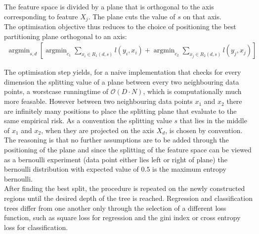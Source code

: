 \documentclass[a4paper, 11pt]{article}
\DeclareMathOperator*{\argmin}{argmin} %
\begin{document}
The feature space is divided by a plane that is orthogonal to the axis corresponding to feature $X_j$. The plane cuts the value of $s$ on that axis.\\
The optimisation objective thus reduces to the choice of positioning  the best partitioning plane orthogonal to an axis:
\begin{align*}
\argmin_{s, d}[\argmin_{c_1} \sum_{x_i \in R_1(d,s)} l(y_i, x_i) + \argmin_{c_2} \sum_{x_j \in R_2(d,s)} l(y_j, x_j)]
\end{align*}

The optimisation step yields, for a naive implementation that checks for every dimension the splitting value of a plane between every two neighbouring data points, a worstcase runningtime of $\mathcal{O}(D \cdot N)$, which is computationally much more feasable. However between two neighbouring data points $x_1$ and $x_2$ there are infinitely many positions to place the splitting plane that evaluate to the same empirical risk. As a convention the splitting value $s$ that lies in the middle of $x_1$ and $x_2$, when they are projected on the axis $X_d$, is chosen by convention. The reasoning is that no further assumptions are to be added through the positioning of the plane and since the splitting of the feature space can be viewed as a bernoulli experiment (data point either lies left or right of plane) the bernoulli distribution with expected value of $0.5$ is the maximum entropy bernoulli. \\

After finding the best split, the procedure is repeated on the newly constructed regions until the desired depth of the tree is reached. Regression and classification trees differ from one another only through the selection of a different loss function, such as square loss for regression and the gini index or cross entropy loss for classification. \\
\end{document}
